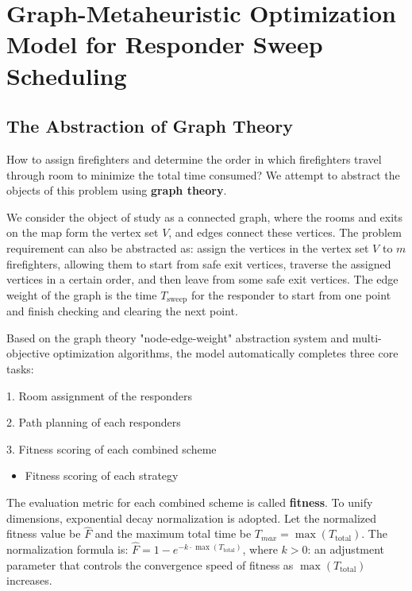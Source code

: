\section{Graph-Metaheuristic Optimization Model for Responder Sweep Scheduling}

\vspace{-0.2cm}%

\subsection{The Abstraction of Graph Theory}

How to assign firefighters and determine the order in which firefighters travel through room to minimize the total time consumed? We attempt to abstract the objects of this problem using \textbf{graph theory}.


We consider the object of study as a connected graph, where the rooms and exits on the map form the vertex set \( V \), and edges connect these vertices. The problem requirement can also be abstracted as: assign the vertices in the vertex set \( V \) to \( m \) firefighters, allowing them to start from safe exit vertices, traverse the assigned vertices in a certain order, and then leave from some safe exit vertices. The edge weight of the graph is the time \( T_{\text{sweep}} \) for the responder to start from one point and finish checking and clearing the next point.






Based on the graph theory "node-edge-weight" abstraction system and multi-objective optimization algorithms, the model automatically completes three core tasks:


1. Room assignment of the responders

2. Path planning of each responders

3. Fitness scoring of each combined scheme


\begin{itemize}
    \item Fitness scoring of each strategy
\end{itemize}


The evaluation metric for each combined scheme is called \textbf{fitness}.
To unify dimensions, exponential decay normalization is adopted. Let the normalized fitness value be $\hat{F}$ and the maximum total time be $T_{max} = \max(T_{\text{total}})$. The normalization formula is: \(
\hat{F} = 1 - e^{-k \cdot \max(T_{\text{total}})}\), where $k > 0$: an adjustment parameter that controls the convergence speed of fitness as $\max(T_{\text{total}})$ increases.

